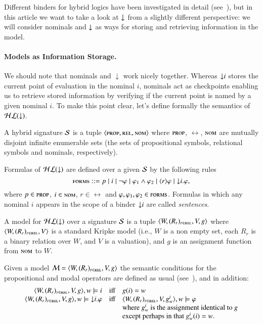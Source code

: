Different binders for hybrid logics have been investigated in detail
(see~\cite{BS95}), but in this article we want to take a look at
${\downarrow}$ from a slightly different perspective: we will consider
nominals and ${\downarrow}$ as ways for storing and retrieving information
in the model.



\paragraph{Models as Information Storage.}
We should note that nominals and $\downarrow$ work nicely together.
Whereas ${\downarrow} i$ stores the current point of evaluation in the
nominal $i$, nominals act as checkpoints enabling us to retrieve
stored information by verifying if the current point is named by a
given nominal $i$.  To make this point clear, let's define formally
the semantics of $\mathcal{HL}({\downarrow})$.

\begin{defn} A hybrid signature $\mathcal{S}$ is a tuple $\langle \textsc{prop},\textsc{rel},\textsc{nom} \rangle$
where $\textsc{prop}$, $\rel$, $\textsc{nom}$ are mutually disjoint infinite
enumerable sets (the sets of propositional symbols, relational
symbols and nominals, respectively).

Formulas of $\mathcal{HL}({\downarrow})$ are defined over a given $\mathcal{S}$ by the
following rules
$$
\textsc{forms} ::= p \mid i \mid \lnot \varphi \mid \varphi_1 \land
\varphi_2 \mid \langle r \rangle \varphi \mid {\downarrow} i. \varphi,
$$
where $p \in \textsc{prop}$, $i \in \textsc{nom}$,  $r \in \rel$  and $\varphi,
\varphi_1, \varphi_2 \in \textsc{forms}$. Formulas in which any nominal $i$
appears in the scope of a binder ${\downarrow} i$ are called
\emph{sentences}.

A model for $\mathcal{HL}({\downarrow})$ over a signature $\mathcal{S}$ is a tuple
$\langle W,(R_r)_{r \in \textsc{rel}},V,g \rangle$ where $\langle W,(R_r)_{r \in \textsc{rel}},V \rangle$ is a standard Kripke
model (i.e., $W$ is a non empty set, each $R_r$ is a binary relation
over $W$, and $V$ is a valuation), and $g$ is an assignment function
from $\textsc{nom}$ to $W$.

Given a model $\mathcal{M} = \langle W,(R_r)_{r \in \textsc{rel}},V,g \rangle$ the semantic conditions
for the propositional and modal operators are defined as usual
(see~\cite{BRV01}), and in addition:
$$
\begin{array}{rcl}
\langle W,(R_r)_{r \in \textsc{rel}},V,g \rangle, w \models  i & \mbox{iff} & g(i) = w\\
\langle W,(R_r)_{r \in \textsc{rel}},V,g \rangle, w \models {\downarrow} i.\varphi & \mbox{iff} &
  \langle W,(R_r)_{r \in \textsc{rel}},V,g^i_w \rangle, w \models \varphi\\
& & \mbox{where $g^i_w$ is the assignment identical to $g$}\\
& & \mbox{except perhaps in that $g^i_w(i)=w$}.
\end{array}
$$
\end{defn}

